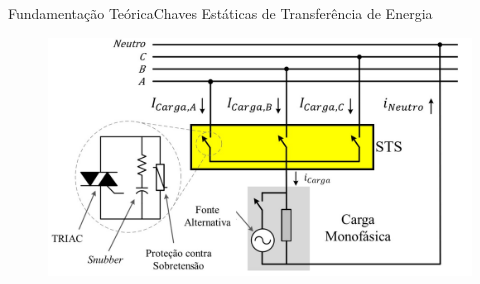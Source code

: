 \begin{frame}{Fundamentação Teórica}{Chaves Estáticas de Transferência de Energia}
\vspace{-0.64cm}
\begin{figure}[htp]
	\centering
	\caption{}
	\includegraphics[width=0.97\linewidth]{img/STS.jpg}
    \hspace{5cm}
\end{figure}
\end{frame}























